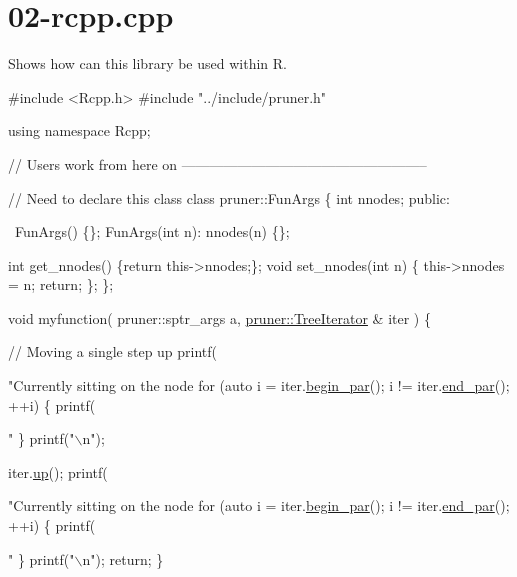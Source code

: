 \hypertarget{02-rcpp_8cpp-example}{}\section{02-\/rcpp.\+cpp}
Shows how can this library be used within R.


\begin{DoxyCodeInclude}
\textcolor{preprocessor}{#include <Rcpp.h>}
\textcolor{preprocessor}{#include "../include/pruner.h"}  

\textcolor{keyword}{using namespace }Rcpp; 

\textcolor{comment}{// Users work from here on -----------------------------------------------------}

\textcolor{comment}{// Need to declare this class}
\textcolor{keyword}{class }pruner::FunArgs \{
  \textcolor{keywordtype}{int} nnodes;
\textcolor{keyword}{public}:
  
  ~FunArgs() \{\};
  FunArgs(\textcolor{keywordtype}{int} n): nnodes(n) \{\};
  
  \textcolor{keywordtype}{int} get\_nnodes() \{\textcolor{keywordflow}{return} this->nnodes;\};
  \textcolor{keywordtype}{void} set\_nnodes(\textcolor{keywordtype}{int} n) \{
    this->nnodes = n;
    \textcolor{keywordflow}{return};
  \};
\};

\textcolor{keywordtype}{void} myfunction(
    pruner::sptr\_args a,
    \hyperlink{classpruner_1_1TreeIterator}{pruner::TreeIterator} & iter
  ) \{
  
  \textcolor{comment}{// Moving a single step up}
  printf(\textcolor{stringliteral}{"Currently sitting on the node %
  \textcolor{keywordflow}{for} (\textcolor{keyword}{auto} i = iter.\hyperlink{classpruner_1_1TreeIterator_a3cb8dd28630f065472e135f7db822abf}{begin\_par}(); i != iter.\hyperlink{classpruner_1_1TreeIterator_aac5656fc5b550cb8dfa4a9ebd5ea910a}{end\_par}(); ++i) \{
    printf(\textcolor{stringliteral}{" %
  \}
  printf(\textcolor{stringliteral}{"\(\backslash\)n"});
  
  iter.\hyperlink{classpruner_1_1TreeIterator_adca1d999f093a69e2f5d044b358e5da7}{up}();
  printf(\textcolor{stringliteral}{"Currently sitting on the node %
  \textcolor{keywordflow}{for} (\textcolor{keyword}{auto} i = iter.\hyperlink{classpruner_1_1TreeIterator_a3cb8dd28630f065472e135f7db822abf}{begin\_par}(); i != iter.\hyperlink{classpruner_1_1TreeIterator_aac5656fc5b550cb8dfa4a9ebd5ea910a}{end\_par}(); ++i) \{
    printf(\textcolor{stringliteral}{" %
  \}
  printf(\textcolor{stringliteral}{"\(\backslash\)n"});
  \textcolor{keywordflow}{return};
\}

}}}}
\end{DoxyCodeInclude}
